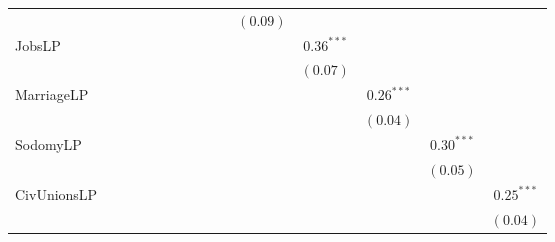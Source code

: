 \begin{table}
\begin{center}
\begin{tabular}{l c c c c c c c c c c c c c c }
                                                          &               &              &              &              &              &              &              &               &               & $(0.09)$      &               &               &               &               \\
JobsLP                                                    &               &              &              &              &              &              &              &               &               &               & $0.36^{***}$  &               &               &               \\
                                                          &               &              &              &              &              &              &              &               &               &               & $(0.07)$      &               &               &               \\
MarriageLP                                                &               &              &              &              &              &              &              &               &               &               &               & $0.26^{***}$  &               &               \\
                                                          &               &              &              &              &              &              &              &               &               &               &               & $(0.04)$      &               &               \\
SodomyLP                                                  &               &              &              &              &              &              &              &               &               &               &               &               & $0.30^{***}$  &               \\
                                                          &               &              &              &              &              &              &              &               &               &               &               &               & $(0.05)$      &               \\
CivUnionsLP                                               &               &              &              &              &              &              &              &               &               &               &               &               &               & $0.25^{***}$  \\
                                                          &               &              &              &              &              &              &              &               &               &               &               &               &               & $(0.04)$      \\

\end{tabular}
\end{center}
\end{table}
